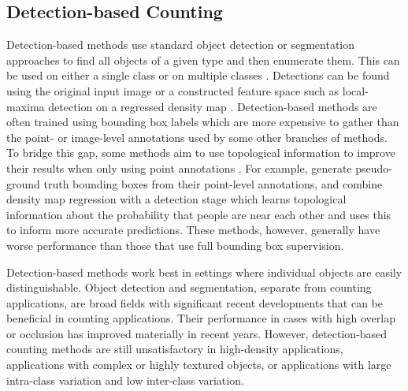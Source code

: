 \documentclass[../thesis.tex]{subfiles}
\begin{document}
\subsection{Detection-based Counting} 
Detection-based methods use standard object detection or segmentation approaches \cite{ren2015fasterrcnn, michaelis2018one} to find all objects of a given type and then enumerate them.  This can be used on either a single class \cite{hsieh2017drone} or on multiple classes \cite{desai2011discriminative}. 
Detections can be found using the original input image or a constructed feature space such as local-maxima detection on a regressed density map \cite{liang2022focal, barinova2012detection, arteta2014interactive, cholakkal2020towards, xu2022autoscale}. 
Detection-based methods are often trained using bounding box labels which are more expensive to gather than the point- or image-level annotations used by some other branches of methods.
To bridge this gap, some methods aim to use topological information to improve their results when only using point annotations \cite{abousamra2021localization, liu2019point, liang2022focal, xu2022autoscale}. 
For example, \citet{liu2019point} generate pseudo-ground truth bounding boxes from their point-level annotations, and \citet{abousamra2021localization} combine density map regression with a detection stage which learns topological information about the probability that people are near each other and uses this to inform more accurate predictions.
These methods, however,  generally have worse performance than those that use full bounding box supervision. 

Detection-based methods work best in settings where individual objects are easily distinguishable.
Object detection and segmentation, separate from counting applications, are broad fields with significant recent developments that can be beneficial in counting applications. Their performance in cases with high overlap or occlusion has improved materially in recent years. However, detection-based counting methods are still unsatisfactory in high-density applications, applications with complex or highly textured objects,  or applications with large intra-class variation and low inter-class variation.
\end{document}
